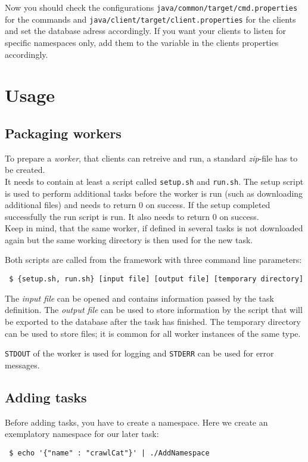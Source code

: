 \documentclass[a4paper,11pt]{article}
\begin{document}
Now you should check the configurations \texttt{java/common/target/cmd.properties} for the commands and \texttt{java/client/target/client.properties} for the clients and set the database adress accordingly. If you want your clients to listen for specific namespaces only, add them to the variable in the clients properties accordingly.

\newpage

\section{Usage}

\subsection{Packaging workers\label{sec:workers}}
To prepare a \textit{worker}, that clients can retreive and run, a standard \textit{zip}-file has to be created.\\
It needs to contain at least a script called \texttt{setup.sh} and \texttt{run.sh}. The setup script is used to perform additional tasks before the worker is run (such as downloading additional files) and needs to return 0 on success. If the setup completed successfully the run script is run. It also needs to return 0 on success.\\
Keep in mind, that the same worker, if defined in several tasks is not downloaded again but the same working directory is then used for the new task.

Both scripts are called from the framework with three command line parameters:
\begin{verbatim}
 $ {setup.sh, run.sh} [input file] [output file] [temporary directory]
\end{verbatim}

The \textit{input file} can be opened and contains information passed by the task definition. The \textit{output file} can be used to store information by the script that will be exported to the database after the task has finished. The temporary directory can be used to store files; it is common for all worker instances of the same type.

\texttt{STDOUT} of the worker is used for logging and \texttt{STDERR} can be used for error messages.

\subsection{Adding tasks}
Before adding tasks, you have to create a namespace. Here we create an exemplatory namespace for our later task:
\begin{verbatim}
 $ echo '{"name" : "crawlCat"}' | ./AddNamespace
\end{verbatim}
\end{document}
